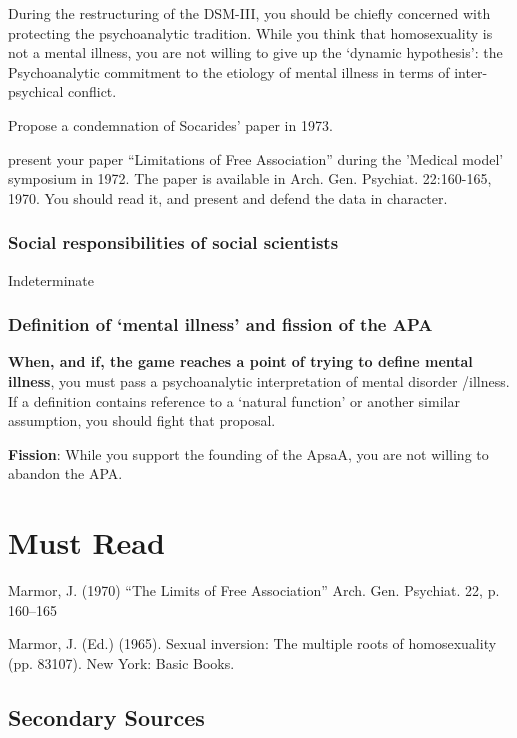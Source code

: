 \begin{refsection}
During the restructuring of the DSM-III, you should be chiefly concerned with protecting the psychoanalytic tradition. While you think that homosexuality is not a mental illness, you are not willing to give up the `dynamic hypothesis': the Psychoanalytic commitment to the etiology of mental illness in terms of inter-psychical conflict.

Propose a condemnation of Socarides’ paper in 1973.
\begin{writingtask}[Marmor]\label{writingtask:marmor}
present your paper “Limitations of Free Association” during the 'Medical model' symposium in 1972. The paper is available in Arch. Gen. Psychiat. 22:160-165, 1970. You should read it, and present and defend the data in character.
\end{writingtask}

\subsubsection{Social responsibilities of social scientists}
\label{socialresponsibilitiesofsocialscientists}

Indeterminate

\subsubsection{Definition of ‘mental illness’ and fission of the APA}
\label{definitionof‘mentalillness’andfissionoftheapa}

\textbf{When, and if, the game reaches a point of trying to define mental illness}, you must pass a psychoanalytic interpretation of mental disorder \slash  illness. If a definition contains reference to a `natural function' or another similar assumption, you should fight that proposal.

\textbf{Fission}: While you support the founding of the ApsaA, you are not willing to abandon the APA.

\section{Must Read}
\label{mustread}

Marmor, J. (1970) “The Limits of Free Association” Arch. Gen. Psychiat. 22, p. 160--165

Marmor, J. (Ed.) (1965). Sexual inversion: The multiple roots of homosexuality (pp. 83107). New York: Basic Books.

\subsection{Secondary Sources}
\label{secondarysources}


\end{refsection}

